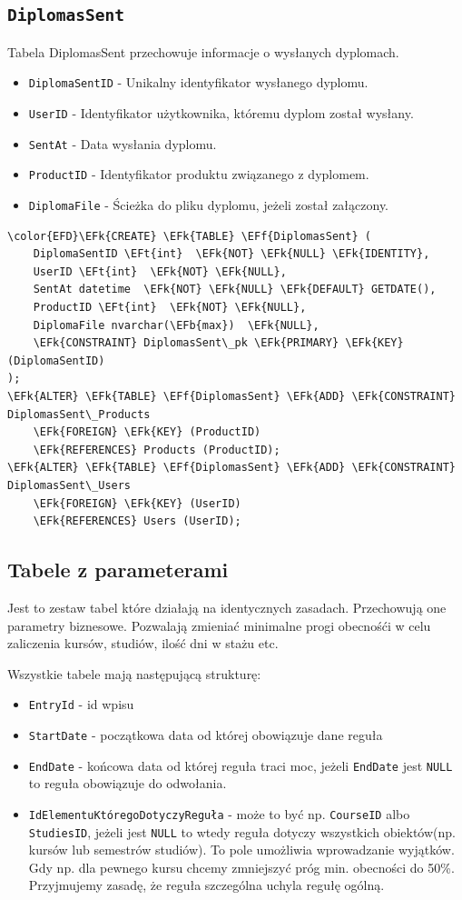 \documentclass[11pt]{article}
\newcommand{\EFk}[1]{\textcolor{EFk}{\textbf{#1}}} %
\newcommand{\EFb}[1]{\textcolor{EFb}{\textbf{#1}}} %
\newcommand{\EFf}[1]{\textcolor{EFf}{#1}} %
\newcommand{\EFt}[1]{\textcolor{EFt}{\textbf{#1}}} %
\begin{document}
\subsection{\texttt{DiplomasSent}}
\label{sec:org722ab0e}
Tabela DiplomasSent przechowuje informacje o wysłanych dyplomach.
\begin{itemize}
\item \texttt{DiplomaSentID} - Unikalny identyfikator wysłanego dyplomu.
\item \texttt{UserID} - Identyfikator użytkownika, któremu dyplom został wysłany.
\item \texttt{SentAt} - Data wysłania dyplomu.
\item \texttt{ProductID} - Identyfikator produktu związanego z dyplomem.
\item \texttt{DiplomaFile} - Ścieżka do pliku dyplomu, jeżeli został załączony.
\end{itemize}
\begin{Code}
\begin{Verbatim}
\color{EFD}\EFk{CREATE} \EFk{TABLE} \EFf{DiplomasSent} (
    DiplomaSentID \EFt{int}  \EFk{NOT} \EFk{NULL} \EFk{IDENTITY},
    UserID \EFt{int}  \EFk{NOT} \EFk{NULL},
    SentAt datetime  \EFk{NOT} \EFk{NULL} \EFk{DEFAULT} GETDATE(),
    ProductID \EFt{int}  \EFk{NOT} \EFk{NULL},
    DiplomaFile nvarchar(\EFb{max})  \EFk{NULL},
    \EFk{CONSTRAINT} DiplomasSent\_pk \EFk{PRIMARY} \EFk{KEY}  (DiplomaSentID)
);
\EFk{ALTER} \EFk{TABLE} \EFf{DiplomasSent} \EFk{ADD} \EFk{CONSTRAINT} DiplomasSent\_Products
    \EFk{FOREIGN} \EFk{KEY} (ProductID)
    \EFk{REFERENCES} Products (ProductID);
\EFk{ALTER} \EFk{TABLE} \EFf{DiplomasSent} \EFk{ADD} \EFk{CONSTRAINT} DiplomasSent\_Users
    \EFk{FOREIGN} \EFk{KEY} (UserID)
    \EFk{REFERENCES} Users (UserID);
\end{Verbatim}
\end{Code}
\subsection{Tabele z parameterami}
\label{sec:org29b3b13}
Jest to zestaw tabel które działają na identycznych zasadach.
Przechowują one parametry biznesowe. Pozwalają zmieniać minimalne progi
obecnośći w celu zaliczenia kursów, studiów, ilość dni w stażu etc.


Wszystkie tabele mają następującą strukturę:
\begin{itemize}
\item \texttt{EntryId} - id wpisu
\item \texttt{StartDate} - początkowa data od której obowiązuje dane reguła
\item \texttt{EndDate} - końcowa data od której reguła traci moc, jeżeli \texttt{EndDate} jest \texttt{NULL} to reguła obowiązuje
do odwołania.
\item \texttt{IdElementuKtóregoDotyczyReguła} - może to być np. \texttt{CourseID} albo \texttt{StudiesID}, jeżeli jest \texttt{NULL} to
wtedy reguła dotyczy wszystkich obiektów(np. kursów lub semestrów studiów). To pole umożliwia
wprowadzanie wyjątków. Gdy np. dla pewnego kursu chcemy zmniejszyć próg min. obecności do 50\%.
Przyjmujemy zasadę, że reguła szczególna uchyla regułę ogólną.
\end{itemize}
\end{document}
